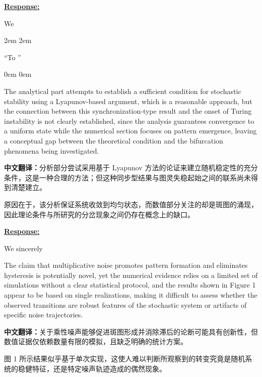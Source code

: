 \documentclass[a4paper,12pt]{article}
\newcommand{\zhtranslationfirst}[1]{%
    \par\medskip\noindent
    {\small\color{blue!60!black}\textbf{中文翻译：}#1}\par
}
\newcommand{\zhtranslation}[1]{%
    \par\smallskip\noindent
    {\small\color{blue!60!black}#1}\par
}
\begin{document}
\noindent \underline {\textbf{Response:}}
\bigskip

We


\leftskip 2em
\rightskip 2em
\medskip

``To ''

\leftskip 0em
\rightskip 0em
\medskip

\newpage
\begin{tcolorbox}[title = {Comment 2},fonttitle = \bfseries]
    The analytical part attempts to establish a sufficient condition for stochastic stability using a Lyapunov-based argument, which is a reasonable approach, but the connection between this synchronization-type result and the onset of Turing instability is not clearly established, since the analysis guarantees convergence to a uniform state while the numerical section focuses on pattern emergence, leaving a conceptual gap between the theoretical condition and the bifurcation phenomena being investigated.
    \zhtranslationfirst{分析部分尝试采用基于 Lyapunov 方法的论证来建立随机稳定性的充分条件，这是一种合理的方法；但这种同步型结果与图灵失稳起始之间的联系尚未得到清楚建立。}
    \zhtranslation{原因在于，该分析保证系统收敛到均匀状态，而数值部分关注的却是斑图的涌现，因此理论条件与所研究的分岔现象之间仍存在概念上的缺口。}
\end{tcolorbox}

\noindent \underline {\textbf{Response:}}
\bigskip

We sincerely

\newpage
\begin{tcolorbox}[title = {Comment 3},fonttitle = \bfseries]
    The claim that multiplicative noise promotes pattern formation and eliminates hysteresis is potentially novel, yet the numerical evidence relies on a limited set of simulations without a clear statistical protocol, and the results shown in Figure 1 appear to be based on single realizations, making it difficult to assess whether the observed transitions are robust features of the stochastic system or artifacts of specific noise trajectories.
    \zhtranslationfirst{关于乘性噪声能够促进斑图形成并消除滞后的论断可能具有创新性，但数值证据仅依赖数量有限的模拟，且缺乏明确的统计方案。}
    \zhtranslation{图 1 所示结果似乎基于单次实现，这使人难以判断所观察到的转变究竟是随机系统的稳健特征，还是特定噪声轨迹造成的偶然现象。}
\end{tcolorbox}
\end{document}
